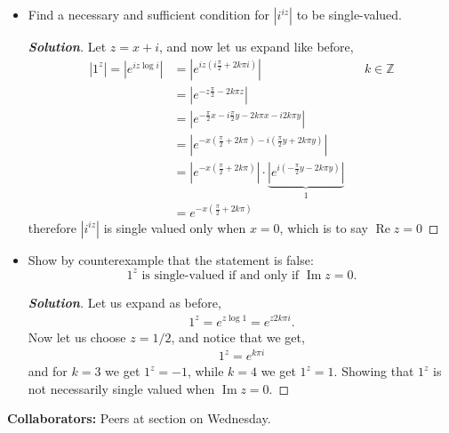 \documentclass[11pt]{article}
\newenvironment{problem}[2][Problem\!]{\begin{trivlist}
\item[\hskip \labelsep {\bfseries #1}\hskip \labelsep {\bfseries #2}]}{\end{trivlist}}
\newenvironment{solution}{\begin{proof}[\textbf{\textit{Solution}}] }{\end{proof}}
\newcommand{\zz}{\mathbb Z}   %
\newcommand{\abs}[1]{\left\lvert#1\right\rvert} %
\renewcommand{\Re}{\operatorname{Re}}
\renewcommand{\Im}{\operatorname{Im}}
\newcommand{\lrp}[1]{\left(#1\right)}
\begin{document}
\begin{problem}{5.6}
\begin{itemize}[itemsep=3em]
\item[(b)] Find a necessary and sufficient condition for $\abs{i^{iz}}$ to be single-valued.
\begin{solution}
  Let $z= x + i $, and now let us expand like before,
  \begin{align*}
    \abs{1^{z}} = \abs{e^{iz\log i }} &= \abs{e^{i z\lrp{i \frac{\pi}{2} + 2k\pi i}}} && k \in \zz \\
    &= \abs{e^{-z \frac{\pi}{2} -2k\pi z}} \\
    &= \abs{e^{-\frac{\pi}{2}x - i\frac{\pi}{2}y - 2k\pi x - i 2k\pi y}}  \\
    &= \abs{e^{-x (\frac{\pi}{2} + 2k\pi) -i(\frac{\pi}{2}y + 2k\pi y)}} \\
    &= \abs{e^{-x (\frac{\pi}{2} + 2k\pi)}}\cdot \underbrace{\abs{e^{i(-\frac{\pi}{2}y - 2k\pi y)}}}_{ 1} \\
    &= e^{-x (\frac{\pi}{2} + 2k\pi)}
  \end{align*}
  therefore $\abs{i^{iz}}$ is single valued only when $x = 0$, which is to say $\Re z = 0$
\end{solution}

\item[(c)] Show by counterexample that the statement is false: \[\text{$1^z$ is single-valued if and only if $\Im z = 0$.}\]
\begin{solution}
  Let us expand as before,
  \begin{align*}
    1^{z} = e^{z\log 1} = e^{z2k\pi i }.
  \end{align*}
  Now let us choose $z = 1/2$, and notice that we get,
  \begin{align*}
    1^{z} = e^{k\pi i }
  \end{align*}
  and for $k = 3$ we get $1^{z} = -1$, while $k=4$ we get $1^{z} = 1$. Showing that $1^{z}$ is not necessarily single valued when $\Im z = 0$. 
\end{solution}

\end{itemize}
\end{problem}



\newpage  %

\begin{center}
\textbf{Collaborators:}
Peers at section on Wednesday. 
\end{center}
\vfill 


\end{document}
